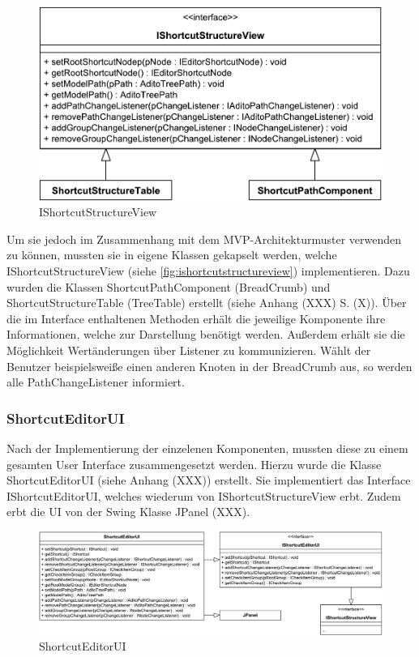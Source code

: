 \begin{figure}
	\vspace{-12px}
	\centering
	\includegraphics[width=1\linewidth]{../graphic/diagrams/CD_IShortcutStructureView/IShortcutStructureView}
	\caption{IShortcutStructureView}
	\label{fig:ishortcutstructureview}
\end{figure}

Um sie jedoch im Zusammenhang mit dem MVP-Architekturmuster verwenden zu können, mussten sie in eigene Klassen gekapselt werden, welche IShortcutStructureView (siehe \autoref{fig:ishortcutstructureview}) implementieren. Dazu wurden die Klassen ShortcutPathComponent (BreadCrumb) und ShortcutStructureTable (TreeTable) erstellt (siehe Anhang (XXX) S. (X)). Über die im Interface enthaltenen Methoden erhält die jeweilige Komponente ihre Informationen, welche zur Darstellung benötigt werden. Außerdem erhält sie die Möglichkeit Wertänderungen über Listener zu kommunizieren. Wählt der Benutzer beispielsweiße einen anderen Knoten in der BreadCrumb aus, so werden alle PathChangeListener informiert.

\subsubsection{ShortcutEditorUI}

Nach der Implementierung der einzelenen Komponenten, mussten diese zu einem gesamten User Interface zusammengesetzt werden. Hierzu wurde die Klasse ShortcutEditorUI (siehe Anhang (XXX)) erstellt. Sie implementiert das Interface IShortcutEditorUI, welches wiederum von IShortcutStructureView erbt. Zudem erbt die UI von der Swing Klasse JPanel (XXX).

\begin{figure}[H]
	\centering
	\includegraphics[width=1\linewidth]{../graphic/diagrams/CD_ShortcutEditorUI/ShortcutEditorUI}
	\caption{ShortcutEditorUI}
	\label{fig:shortcuteditorui}
\end{figure} 

